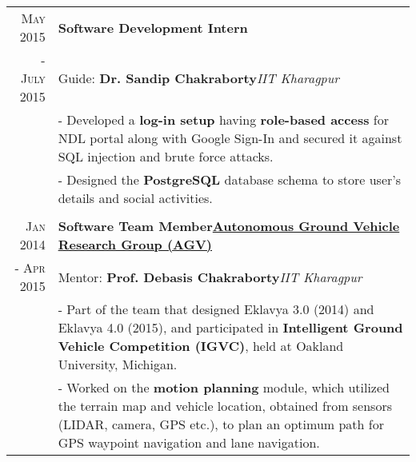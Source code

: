 \begin{tabular}{r|p{16.3cm}}
\textsc{May 2015} & \textbf{Software Development Intern}\hfill\textbf {\lowercase{\href{https://ndl.iitkgp.ac.in}}{National Digital Library of India}}\\
\textsc{- July 2015}& \scriptsize{Guide: \textbf{Dr. Sandip Chakraborty}}\hfill\textit{IIT Kharagpur}\\
& \footnotesize{- Developed a \textbf{log-in setup} having \textbf{role-based access} for NDL portal along with Google Sign-In and secured it against SQL injection and brute force attacks.}\\
& \footnotesize{- Designed the \textbf{PostgreSQL} database schema to store user's details and social activities.}\\
\multicolumn{2}{c}{} \\

\textsc{Jan 2014} & \textbf{Software Team Member}\hfill\textbf{\href{http://agv-iit-kgp.github.io/}{Autonomous Ground Vehicle Research Group (AGV)}}\\
\textsc{- Apr 2015}& \scriptsize{Mentor: \textbf{Prof. Debasis Chakraborty}}\hfill\textit{IIT Kharagpur}\\
& \footnotesize{- Part of the team that designed Eklavya 3.0 (2014) and Eklavya 4.0 (2015), and participated in \textbf{Intelligent Ground Vehicle Competition (IGVC)}, held at Oakland University, Michigan.}\\
& \footnotesize{- Worked on the \textbf{motion planning} module, which utilized the terrain map and vehicle location, obtained from sensors (LIDAR, camera, GPS etc.), to plan an optimum path for GPS waypoint navigation and lane navigation.}\\

\end{tabular}
